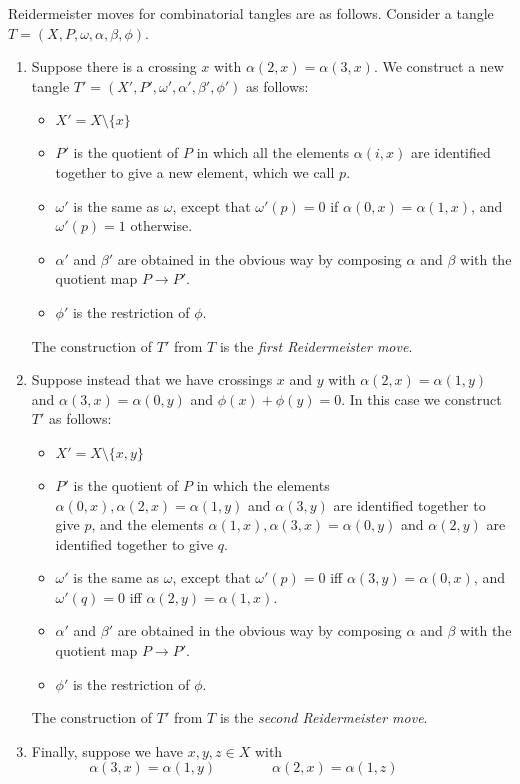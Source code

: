 \documentclass{amsart}
\newcommand{\al}        {\alpha}
\newcommand{\bt}        {\beta}
\newcommand{\om}        {\omega}
\newcommand{\sm}        {\setminus}
\renewcommand{\:}{\colon}
\theoremstyle{definition}
\begin{document}
Reidermeister moves for combinatorial tangles are as follows.
Consider a tangle $T=(X,P,\om,\al,\bt,\phi)$.
\begin{enumerate}
 \item Suppose there is a crossing $x$ with $\al(2,x)=\al(3,x)$.  We
  construct a new tangle $T'=(X',P',\om',\al',\bt',\phi')$ as follows:
  \begin{itemize}
   \item $X'=X\sm\{x\}$
   \item $P'$ is the quotient of $P$ in which all the elements
    $\al(i,x)$ are identified together to give a new element, which we
    call $p$.
   \item $\om'$ is the same as $\om$, except that $\om'(p)=0$ if
    $\al(0,x)=\al(1,x)$, and $\om'(p)=1$ otherwise.
   \item $\al'$ and $\bt'$ are obtained in the obvious way by
    composing $\al$ and $\bt$ with the quotient map $P\to P'$.
   \item $\phi'$ is the restriction of $\phi$.
  \end{itemize}
  The construction of $T'$ from $T$ is the \emph{first Reidermeister
   move}. 
 \item Suppose instead that we have crossings $x$ and $y$ with
  $\al(2,x)=\al(1,y)$ and $\al(3,x)=\al(0,y)$ and
  $\phi(x)+\phi(y)=0$.  In this case we construct $T'$ as follows:
  \begin{itemize}
   \item $X'=X\sm\{x,y\}$
   \item $P'$ is the quotient of $P$ in which the elements
    $\al(0,x),\al(2,x)=\al(1,y)$ and $\al(3,y)$ are identified
    together to give $p$, and the elements
    $\al(1,x),\al(3,x)=\al(0,y)$ and $\al(2,y)$ are identified
    together to give $q$.
   \item $\om'$ is the same as $\om$, except that $\om'(p)=0$ iff
    $\al(3,y)=\al(0,x)$, and $\om'(q)=0$ iff $\al(2,y)=\al(1,x)$.
   \item $\al'$ and $\bt'$ are obtained in the obvious way by
    composing $\al$ and $\bt$ with the quotient map $P\to P'$.
   \item $\phi'$ is the restriction of $\phi$.
  \end{itemize}
  The construction of $T'$ from $T$ is the \emph{second Reidermeister
   move}. 
 \item Finally, suppose we have $x,y,z\in X$ with 
  \[ \al(3,x) = \al(1,y) \hspace{4em}
     \al(2,x) = \al(1,z) \hspace{4em}
\]
\end{enumerate}
\end{document}
